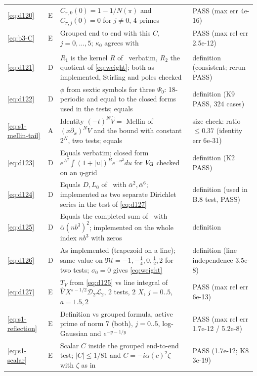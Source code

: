 \documentclass[11pt]{article}
\numberwithin{equation}{section}
\begin{document}
\begin{longtable}{@{}>{\raggedright\arraybackslash}p{1.2cm}>{\centering\arraybackslash}p{0.7cm}>{\raggedright\arraybackslash}p{9.05cm}>{\raggedright\arraybackslash}p{4.3cm}@{}}
\eqref{eq:d120} & E & $C_{\pi,0}(0)=1-1/N(\pi)$ and $C_{\pi,j}(0)=0$ for $j\ne0$, 4 primes & PASS (max err 4e-16)\\
\eqref{eq:b3-C} & E & Grouped end to end with this $C$, $j=0,\dots,5$; $\kappa_0$ agrees with \cite[(A.10)]{OAI1112} & PASS (max rel err 2.5e-12)\\
\multicolumn{4}{@{}l}{\emph{Appendix~B}}\\
\eqref{eq:d121} & D & $R_1$ is the kernel $R$ of~\cite{OAI78} verbatim, $R_2$ the quotient of \eqref{eq:weight}; both as implemented, Stirling and poles checked & definition (consistent; rerun PASS)\\
\eqref{eq:d122} & D & $\phi$ from sextic symbols for three $\Psi_0$: 18-periodic and equal to the closed forms used in the tests; equals \cite{OAI78} & definition (K9 PASS, 324 cases)\\
\eqref{eq:s1-mellin-tail} & A & Identity $(-t)^N\widehat V=$ Mellin of $(x\partial_x)^NV$ and the bound with constant $2^N$, two tests; equals \cite[eq.~(4.11)]{OAI78} & size check: ratio $\le0.37$ (identity err 6e-31)\\
\eqref{eq:d123} & D & Equals \cite{OAI78} verbatim; closed form $e^{A^2}\int(1+|u|)^Be^{-u^2}du$ for $V_{\rm G}$ checked on an $\eta$-grid & definition (K2 PASS)\\
\eqref{eq:d124} & D & Equals $D,L_0$ of~\cite{OAI78} with $\bar\alpha^2,\bar\alpha^6$; implemented as two separate Dirichlet series in the test of \eqref{eq:d127} & definition (used in B.8 test, PASS)\\
\eqref{eq:d125} & D & Equals the completed sum of~\cite{OAI78} with $\bar\alpha(nb^3)^2$; implemented on the whole index $nb^3$ with zeros & definition\\
\eqref{eq:d126} & D & As implemented (trapezoid on a line); same value on $\Re t=-1,-\frac14,0,\frac12,2$ for two tests; $\sigma_0=0$ gives \eqref{eq:weight} & definition (line independence 3.5e-8)\\
\eqref{eq:d127} & E & $T_V$ from \eqref{eq:d125} vs line integral of $\widehat V\,X^{s-1/2}\mathcal D_2\mathcal L_2$, 2 tests, 2 $X$, $j=0..5$, $a=1.5,2$ & PASS (max rel err 6e-13)\\
\eqref{eq:s1-reflection} & E & Definition vs grouped formula, active prime of norm 7 (both), $j=0..5$, log-Gaussian and $e^{-y-1/y}$ & PASS (max rel err 1.7e-12 / 5.2e-8)\\
\eqref{eq:s1-scalar} & E & Scalar $C$ inside the grouped end-to-end test; $|C|\le1/81$ and $C=-i\bar\alpha(c)^2\zeta$ with $\zeta$ as in~\cite{OAI78} & PASS (1.7e-12; K8 3e-19)\\

\end{longtable}
\end{document}
